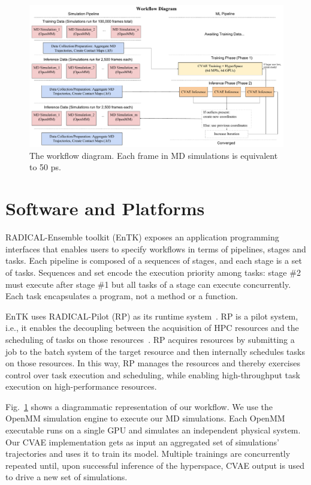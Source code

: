 \documentclass[conference,final]{IEEEtran}
\begin{document}
\begin{figure}
	\centering
	\includegraphics[width=.8\textwidth]{MicroScope_Workflow_Diagram}
	\caption{The workflow diagram. Each frame in MD simulations is equivalent to 50 ps. }
	\label{fig:microscopeworkflowdiagram}
\end{figure}

\section{Software and Platforms}

RADICAL-Ensemble toolkit (EnTK) exposes an application programming interfaces
that enables users to specify workflows in terms of pipelines, stages and
tasks. Each pipeline is composed of a sequences of stages, and each stage is a
set of tasks. Sequences and set encode the execution priority among tasks:
stage \#2 must execute after stage \#1 but all tasks of a stage can execute
concurrently. Each task encapsulates a program, not a method or a function.

EnTK uses RADICAL-Pilot (RP) as its runtime system~\cite{merzky2018using}. RP
is a pilot system, i.e., it enables the decoupling between the acquisition of
HPC resources and the scheduling of tasks on those
resources~\cite{turilli2018comprehensive}. RP acquires resources by submitting
a job to the batch system of the target resource and then internally schedules
tasks on those resources. In this way, RP manages the resources and thereby
exercises control over task execution and scheduling, while enabling
high-throughput task execution on high-performance resources.

Fig.~\ref{fig:microscopeworkflowdiagram} shows a diagrammatic representation
of our workflow. We use the OpenMM simulation engine to execute our MD
simulations. Each OpenMM executable runs on a single GPU and simulates an
independent physical system. Our CVAE implementation gets as input an
aggregated set of simulations' trajectories and uses it to train its model.
Multiple trainings are concurrently repeated until, upon successful inference
of the hyperspace, CVAE output is used to drive a new set of simulations.
\end{document}
